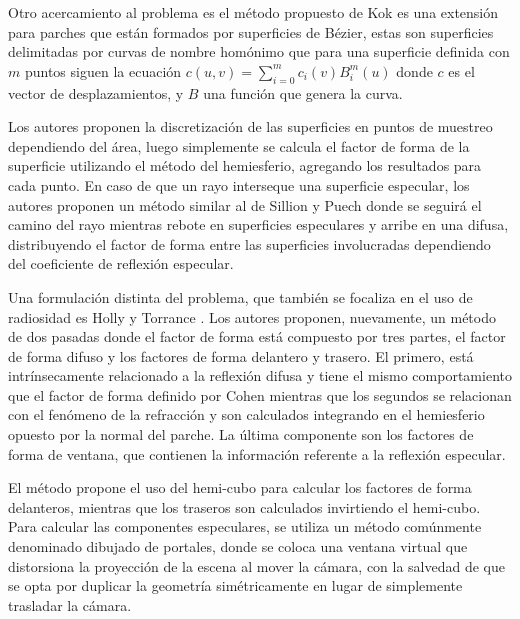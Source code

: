 Otro acercamiento al problema es el método propuesto de Kok \cite{Kok} es una extensión para parches que están formados por superficies de Bézier, estas son superficies delimitadas por curvas de nombre homónimo que para una superficie definida con $m$ puntos siguen la ecuación $c(u,v) = \sum_{i=0}^{m} c_{i}(v)B_{i}^{m}(u)$ donde $c$ es el vector de desplazamientos, y $B$ una función que genera la curva.

Los autores proponen la discretización de las superficies en puntos de muestreo dependiendo del área, luego simplemente se calcula el factor de forma de la superficie utilizando el método del hemiesferio, agregando los resultados para cada punto. En caso de que un rayo interseque una superficie especular, los autores proponen un método similar al de Sillion y Puech \cite{Sillion} donde se seguirá el camino del rayo mientras rebote en superficies especulares y arribe en una difusa, distribuyendo el factor de forma entre las superficies involucradas dependiendo del coeficiente de reflexión especular.

Una formulación distinta del problema, que también se focaliza en el uso de radiosidad es Holly y Torrance \cite{Holly}. Los autores proponen, nuevamente, un método de dos pasadas donde el factor de forma está compuesto por tres partes, el factor de forma difuso y los factores de forma delantero y trasero. El primero, está intrínsecamente relacionado a la reflexión difusa y tiene el mismo comportamiento que el factor de forma definido por Cohen \cite{Cohen} mientras que los segundos se relacionan con el fenómeno de la refracción y son calculados integrando en el hemiesferio opuesto por la normal del parche. La última componente son los factores de forma de ventana, que contienen la información referente a la reflexión especular.

El método propone el uso del hemi-cubo para calcular los factores de forma delanteros, mientras que los traseros son calculados invirtiendo el hemi-cubo. Para calcular las componentes especulares, se utiliza un método comúnmente denominado dibujado de portales, donde se coloca una ventana virtual que distorsiona la proyección de la escena al mover la cámara, con la salvedad de que se opta por duplicar la geometría simétricamente en lugar de simplemente trasladar la cámara.